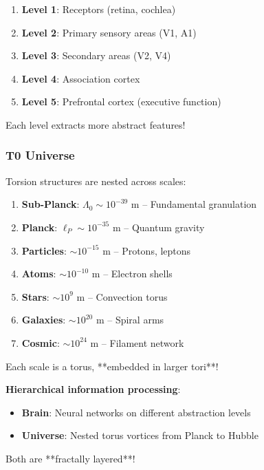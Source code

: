 	\begin{enumerate}
		\item \textbf{Level 1}: Receptors (retina, cochlea)
		\item \textbf{Level 2}: Primary sensory areas (V1, A1)
		\item \textbf{Level 3}: Secondary areas (V2, V4)
		\item \textbf{Level 4}: Association cortex
		\item \textbf{Level 5}: Prefrontal cortex (executive function)
	\end{enumerate}
	
	Each level extracts more abstract features!
	
	\subsubsection{T0 Universe}
	
	Torsion structures are nested across scales:
	
	\begin{enumerate}
		\item \textbf{Sub-Planck}: $\Lambda_0 \sim 10^{-39}$ m -- Fundamental granulation
		\item \textbf{Planck}: $\ell_P \sim 10^{-35}$ m -- Quantum gravity
		\item \textbf{Particles}: $\sim 10^{-15}$ m -- Protons, leptons
		\item \textbf{Atoms}: $\sim 10^{-10}$ m -- Electron shells
		\item \textbf{Stars}: $\sim 10^9$ m -- Convection torus
		\item \textbf{Galaxies}: $\sim 10^{20}$ m -- Spiral arms
		\item \textbf{Cosmic}: $\sim 10^{24}$ m -- Filament network
	\end{enumerate}
	
	Each scale is a torus, **embedded in larger tori**!
	
	\begin{keyresult}
		\textbf{Hierarchical information processing}:
		
		\begin{itemize}
			\item \textbf{Brain}: Neural networks on different abstraction levels
			\item \textbf{Universe}: Nested torus vortices from Planck to Hubble
		\end{itemize}
		
		Both are **fractally layered**!
	\end{keyresult}
	
